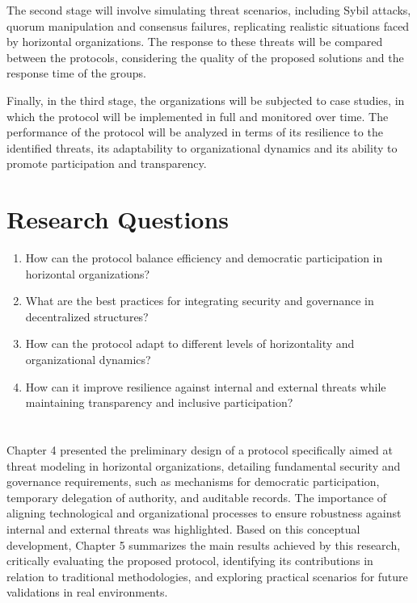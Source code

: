 The second stage will involve simulating threat scenarios, including Sybil
attacks, quorum manipulation and consensus failures, replicating realistic
situations faced by horizontal organizations. The response to these threats will
be compared between the protocols, considering the quality of the proposed
solutions and the response time of the groups.

Finally, in the third stage, the organizations will be subjected to case
studies, in which the protocol will be implemented in full and monitored over
time. The performance of the protocol will be analyzed in terms of its
resilience to the identified threats, its adaptability to organizational
dynamics and its ability to promote participation and transparency.

\section{Research Questions}
\label{sec:research_questions}

\begin{enumerate}
    \item How can the protocol balance efficiency and democratic participation
in horizontal organizations?
    \item What are the best practices for integrating security and governance
in decentralized structures?
    \item How can the protocol adapt to different levels of horizontality and
organizational dynamics?
    \item How can it improve resilience against internal and external threats
while maintaining transparency and inclusive participation?
\end{enumerate}

\section*{}
Chapter 4 presented the preliminary design of a protocol specifically aimed at
threat modeling in horizontal organizations, detailing fundamental security and
governance requirements, such as mechanisms for democratic participation,
temporary delegation of authority, and auditable records. The importance of
aligning technological and organizational processes to ensure robustness against
internal and external threats was highlighted. Based on this conceptual
development, Chapter 5 summarizes the main results achieved by this research,
critically evaluating the proposed protocol, identifying its contributions in
relation to traditional methodologies, and exploring practical scenarios for
future validations in real environments.
